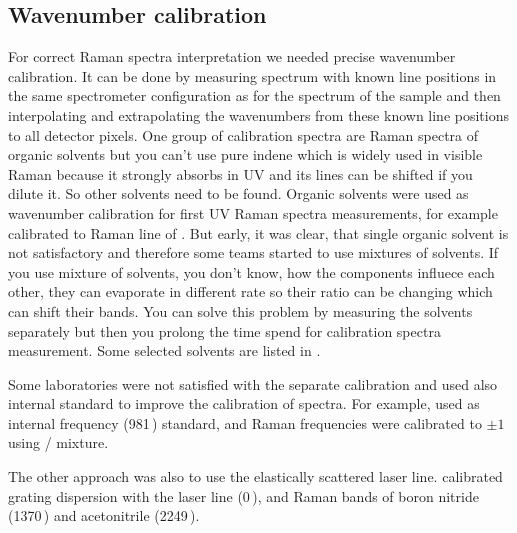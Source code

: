 \subsection{Wavenumber calibration}

For correct Raman spectra interpretation we needed precise wavenumber
calibration. It can be done by measuring spectrum with known line positions
in the same spectrometer configuration as for the spectrum of the sample and
then interpolating and extrapolating the wavenumbers from these known line
positions to all detector pixels. One group of calibration spectra are Raman
spectra of organic solvents but you can't use pure indene which is widely
used in visible Raman because it strongly absorbs in UV and its lines can be
shifted if you dilute it. So other solvents need to be found. Organic
solvents were used as wavenumber calibration for first UV Raman spectra
measurements, for example \textcite{Harada1975} calibrated to Raman line of
. But early, it was clear, that single organic solvent is not
satisfactory and therefore some teams started to use mixtures of solvents.
If you use mixture of solvents, you don't know, how the components influece
each other, they can evaporate in different rate so their ratio can be
changing which can shift their bands. You can solve this problem by measuring
the solvents separately but then you prolong the time spend for calibration
spectra measurement. Some selected solvents are listed in
.

\begin{table}
	\centering
	
	\caption{%
		Selection of organic solvents which were used for UV Raman spectra
		wavenumber calibration in literature.%
	}
	\label{\tablabel{wavenumber_calibration:solvents}}
\end{table}

Some laboratories were not satisfied with the separate calibration and used
also internal standard to improve the calibration of spectra. For example,
\textcite{Wen1998} used  as internal frequency (981\,\icm) standard,
and Raman frequencies were calibrated to $\pm1 $\,\icm{} using
/ mixture.

The other approach was also to use the elastically scattered laser line.
 \textcite{Kumamoto2012} calibrated grating dispersion with the laser line
(0\,\icm), and Raman bands of boron nitride (1370\,\icm) and acetonitrile
(2249\,\icm).

